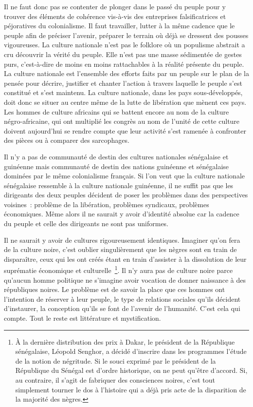 \documentclass[french,twoside]{book} %
\begin{document}
Il ne faut donc pas se contenter de plonger dans le passé du peuple pour y trouver des éléments de cohérence vis-à-vis des entreprises falsificatrices et péjoratives du colonialisme. Il faut travailler, lutter à la même cadence que le peuple afin de préciser l’avenir, préparer le terrain où déjà se dressent des pousses vigoureuses. La culture nationale n’est pas le folklore où un populisme abstrait a cru découvrir la vérité du peuple. Elle n’est   pas une masse sédimentée de gestes purs, c’est-à-dire de moins en moins rattachables à la réalité présente du peuple. La culture nationale est l’ensemble des efforts faits par un peuple sur le plan de la pensée pour décrire, justifier et chanter l’action à travers laquelle le peuple s’est constitué et s’est maintenu. La culture nationale, dans les pays sous-développés, doit donc se situer au centre même de la lutte de libération que mènent ces pays. Les hommes de culture africains qui se battent encore au nom de la culture négro-africaine, qui ont multiplié les congrès au nom de l’unité de cette culture doivent aujourd’hui se rendre compte que leur activité s’est ramenée à confronter des pièces ou à comparer des sarcophages.\par
\bigbreak
\noindent Il n’y a pas de communauté de destin des cultures nationales sénégalaise et guinéenne mais communauté de destin des nations guinéenne et sénégalaise dominées par le même colonialisme français. Si l’on veut que la culture nationale sénégalaise ressemble à la culture nationale guinéenne, il ne suffit pas que les dirigeants des deux peuples décident de poser les problèmes dans des perspectives voisines : problème de la libération, problèmes syndicaux, problèmes économiques. Même alors il ne saurait y avoir d’identité absolue car la cadence du peuple et celle des dirigeants ne sont pas uniformes.\par
\bigbreak
\noindent Il ne saurait y avoir de cultures rigoureusement identiques. Imaginer qu’on fera de la culture noire, c’est oublier singulièrement que les nègres sont en train de disparaître, ceux qui les ont créés étant en train d’assister à la dissolution de leur suprématie économique et culturelle \footnote{À la dernière distribution des prix à Dakar, le président de la République sénégalaise, Léopold Senghor, a décidé d’inscrire dans les programmes l’étude de la notion de négritude. Si le souci exprimé par le président de la République du Sénégal est d’ordre historique, on ne peut qu’être d’accord. Si, au contraire, il s’agit de fabriquer des consciences noires, c’est tout simplement tourner le dos à l’histoire qui a déjà pris acte de la disparition de la majorité des nègres.}. Il n’y aura pas de culture noire parce   qu’aucun homme politique ne s’imagine avoir vocation de donner naissance à des républiques noires. Le problème est de savoir la place que ces hommes ont l’intention de réserver à leur peuple, le type de relations sociales qu’ils décident d’instaurer, la conception qu’ils se font de l’avenir de l’humanité. C’est cela qui compte. Tout le reste est littérature et mystification.\par
\end{document}
